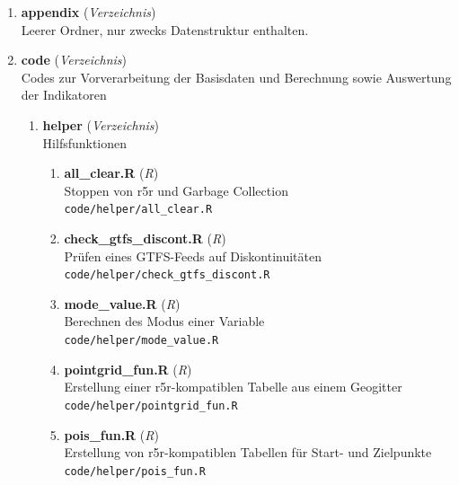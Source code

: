 

\begin{enumerate}[label=\arabic*., leftmargin=*, itemsep=0.5em, topsep=0.3em]
\item \textbf{appendix} \textnormal{(\textit{Verzeichnis})}\\
Leerer Ordner, nur zwecks Datenstruktur enthalten.
\item \textbf{code} \textnormal{(\textit{Verzeichnis})}\\
Codes zur Vorverarbeitung der Basisdaten und Berechnung sowie Auswertung der Indikatoren
\begin{enumerate}[label=\arabic{enumi}.\arabic*, leftmargin=*, itemsep=0.5em, topsep=0.3em]
\item \textbf{helper} \textnormal{(\textit{Verzeichnis})}\\
Hilfsfunktionen
\begin{enumerate}[label=\arabic{enumi}.\arabic{enumii}.\arabic*, leftmargin=*, itemsep=0.5em, topsep=0.3em]
\item \textbf{all\_clear.R} \textnormal{(\textit{R})}\\
Stoppen von r5r und Garbage Collection\\
\texttt{\small code/helper/all\_clear.R}
\item \textbf{check\_gtfs\_discont.R} \textnormal{(\textit{R})}\\
Prüfen eines GTFS-Feeds auf Diskontinuitäten\\
\texttt{\small code/helper/check\_gtfs\_discont.R}
\item \textbf{mode\_value.R} \textnormal{(\textit{R})}\\
Berechnen des Modus einer Variable\\
\texttt{\small code/helper/mode\_value.R}
\item \textbf{pointgrid\_fun.R} \textnormal{(\textit{R})}\\
Erstellung einer r5r-kompatiblen Tabelle aus einem Geogitter\\
\texttt{\small code/helper/pointgrid\_fun.R}
\item \textbf{pois\_fun.R} \textnormal{(\textit{R})}\\
Erstellung von r5r-kompatiblen Tabellen für Start- und Zielpunkte\\
\texttt{\small code/helper/pois\_fun.R}

\end{enumerate}
\end{enumerate}
\end{enumerate}
